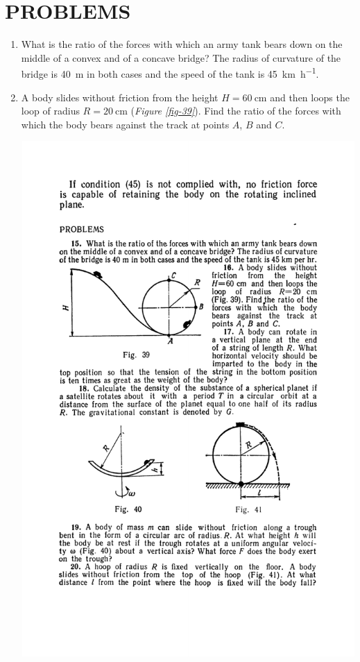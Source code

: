\documentclass[a4paper,sfsidenotes]{tufte-book}
\begin{document}
\section{PROBLEMS}
\begin{enumerate}[resume*=problems]
\item What is the ratio of the forces with which an army tank bears down
on the middle of a convex and of a concave bridge? The radius of curvature
of the bridge is \SI{40}{\metre} in both cases and the speed of the tank is \SI[per-mode=symbol]{45}{\kilo\metre\per\hour}.
\item A body slides without friction from the height $H=\SI{60}{\centi\metre}$ and then loops the
loop of radius $R=\SI{20}{\centi\metre}$ (\emph{Figure \ref{fig-39}}). Find the ratio of the forces with which the body bears against the track at points $A$, $B$ and $C$.
\begin{marginfigure}[-6cm]
\centering
\includegraphics[width=\linewidth]{fig-039a.pdf}

\end{marginfigure}
\end{enumerate}
\end{document}

